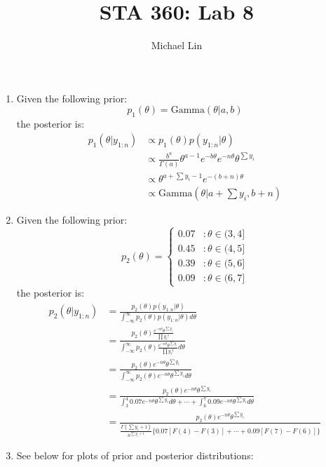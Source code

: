 \documentclass{article}
\title{STA 360: Lab 8}
\author{Michael Lin}
\begin{document}
\maketitle

\begin{enumerate}
\item Given the following prior:
$$p_1(\theta) = \text{Gamma}(\theta|a,b) $$
the posterior is:
\begin{align*}
p_1(\theta|y_{1:n}) &\propto p_1(\theta)p(y_{1:n}|\theta) \\
&\propto \frac{b^a}{\Gamma(a)}\theta^{a-1}e^{-b\theta}e^{-n\theta}\theta^{\sum y_i} \\
&\propto \theta^{a+\sum y_i -1}e^{-(b+n)\theta}\\
&\propto \text{Gamma}(\theta|a+\sum y_i, b+n)
\end{align*}



\item Given the following prior:
 \[p_2(\theta) = \left\{
   \begin{array}{lr}
     0.07 & : \theta \in (3,4]\\
     0.45 & : \theta \in (4,5] \\
     0.39 & : \theta \in (5,6] \\
     0.09 & : \theta \in (6,7]
   \end{array}
 \right.
 \]
 the posterior is:
\begin{align*}
p_2(\theta|y_{1:n}) &= \frac{p_2(\theta)p(y_{1:n}|\theta)}{\int_{-\infty}^{\infty}p_2(\theta)p(y_{1:n}|\theta) d\theta} \\
&= \frac{p_2(\theta)\frac{e^{-n\theta}\theta^{\sum y_i}}{\prod y_i !}}{\int_{-\infty}^{\infty}p_2(\theta)\frac{e^{-n\theta}\theta^{\sum y_i}}{\prod y_i !}d\theta}\\
&= \frac{p_2(\theta)e^{-n\theta}\theta^{\sum y_i}}{\int_{-\infty}^{\infty}p_2(\theta)e^{-n\theta}\theta^{\sum y_i}d\theta}\\
&= \frac{p_2(\theta)e^{-n\theta}\theta^{\sum y_i}}{\int_{3}^{4}0.07e^{-n\theta}\theta^{\sum y_i}d\theta + \cdots + \int_{6}^{7}0.09e^{-n\theta}\theta^{\sum y_i}d\theta}\\
&=\frac{p_2(\theta)e^{-n\theta}\theta^{\sum y_i}}{\frac{\Gamma(\sum y_i +1)}{n^{\sum y_i + 1}}\{0.07[F(4)-F(3)] + \cdots + 0.09[F(7)-F(6)]\}}
\end{align*}

\item See below for plots of prior and posterior distributions:


\end{enumerate}
\end{document}
